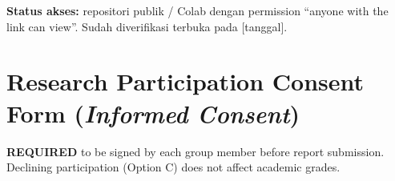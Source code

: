 \documentclass[11pt,a4paper,oneside]{report}
\renewcommand{\appendixname}{LAMPIRAN}
\begin{document}
\textbf{Status akses:} repositori publik / Colab dengan permission ``anyone with the link can view''. Sudah diverifikasi terbuka pada [tanggal].

\renewcommand{\appendixname}{APPENDIX}

\chapter{Research Participation Consent Form (\textit{Informed Consent})}
\label{lamp:consent}

\begin{petunjuk}
\small
\textbf{REQUIRED} to be signed by each group member before report submission. Declining participation (Option C) does not affect academic grades.
\end{petunjuk}
\end{document}
